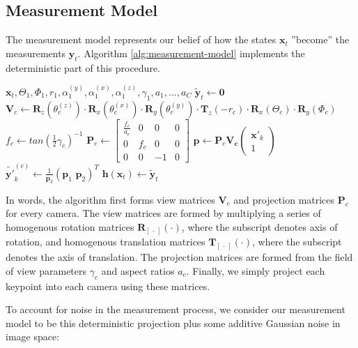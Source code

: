 \documentclass[sigconf, nonacm]{acmart}
\begin{document}
\subsection{Measurement Model}
The measurement model represents our belief of how the states $\mathbf{x}_t$ ''become'' the measurements $\mathbf{y}_t$. Algorithm \ref{alg:measurement-model} implements the deterministic part of this procedure.
\begin{algorithm}
\caption{Deterministic State Measurement $\mathbf{h}(\mathbf{x}_t)$}\label{alg:measurement-model}
\begin{algorithmic}
\Require $\mathbf{x}_t, \Theta_1, \Phi_1, r_1, \alpha_{1}^{(y)},\alpha_{1}^{(x)},\alpha_{1}^{(z)}, \gamma_1, a_1, ..., a_C$
\State $\tilde{\mathbf{y}}_t \gets \mathbf{0}$
\State $\mathbf{V}_c \gets \mathbf{R}_z(\theta_{c}^{(z)})\cdot \mathbf{R}_x(\theta_{c}^{(x)})\cdot \mathbf{R}_y(\theta_{c}^{(y)})\cdot \mathbf{T}_z(-r_c)\cdot\mathbf{R}_x(\Theta_c)\cdot \mathbf{R}_y(\Phi_c)$ 
\State $f_c \gets {tan(\frac{1}{2}\gamma_c)}^{-1}$
\State $\mathbf{P}_c \gets \begin{bmatrix}
    \frac{f_c}{a_c} & 0 &0 & 0 \\
    0 & f_c & 0 & 0 \\
    0 & 0 & -1 & 0
\end{bmatrix}$
\State $\mathbf{p} \gets \mathbf{P}_c\mathbf{V_c}\begin{pmatrix}
    \mathbf{x'}_k \\ 1
\end{pmatrix}$
\State ${\tilde{\mathbf{y'}}}_k^{(c)} \gets \frac{1}{\mathbf{p}_3}(\mathbf{p}_1\,\, \mathbf{p}_2)^T$
\EndFor
\EndFor
\State $\mathbf{h}(\mathbf{x}_t) \gets \tilde{\mathbf{y}}_t $
\end{algorithmic}
\end{algorithm}
In words, the algorithm first forms view matrices $\mathbf{V}_c$ and projection matrices $\mathbf{P}_c$ for every camera. The view matrices are formed by multiplying a series of homogenous rotation matrices $\mathbf{R}_{[\,\cdot\,]}(\cdot)$, where the subscript denotes axis of rotation, and homogenous translation matrices $\mathbf{T}_{[\,\cdot\,]}(\cdot)$, where the subscript denotes the axis of translation. The projection matrices are formed from the field of view parameters $\gamma_c$ and aspect ratios $a_c$. Finally, we simply project each keypoint into each camera using these matrices. \par
To account for noise in the measurement process, we consider our measurement model to be this deterministic projection plus some additive Gaussian noise in image space:
\end{document}
